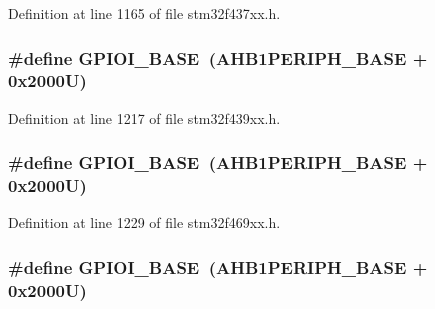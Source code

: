 Definition at line 1165 of file stm32f437xx.\+h.

\subsubsection[{\texorpdfstring{G\+P\+I\+O\+I\+\_\+\+B\+A\+SE}{GPIOI_BASE}}]{\setlength{\rightskip}{0pt plus 5cm}\#define G\+P\+I\+O\+I\+\_\+\+B\+A\+SE~({\bf A\+H\+B1\+P\+E\+R\+I\+P\+H\+\_\+\+B\+A\+SE} + 0x2000\+U)}\hypertarget{group___peripheral__memory__map_ga50acf918c2e1c4597d5ccfe25eb3ad3d}{}\label{group___peripheral__memory__map_ga50acf918c2e1c4597d5ccfe25eb3ad3d}


Definition at line 1217 of file stm32f439xx.\+h.

\subsubsection[{\texorpdfstring{G\+P\+I\+O\+I\+\_\+\+B\+A\+SE}{GPIOI_BASE}}]{\setlength{\rightskip}{0pt plus 5cm}\#define G\+P\+I\+O\+I\+\_\+\+B\+A\+SE~({\bf A\+H\+B1\+P\+E\+R\+I\+P\+H\+\_\+\+B\+A\+SE} + 0x2000\+U)}\hypertarget{group___peripheral__memory__map_ga50acf918c2e1c4597d5ccfe25eb3ad3d}{}\label{group___peripheral__memory__map_ga50acf918c2e1c4597d5ccfe25eb3ad3d}


Definition at line 1229 of file stm32f469xx.\+h.

\subsubsection[{\texorpdfstring{G\+P\+I\+O\+I\+\_\+\+B\+A\+SE}{GPIOI_BASE}}]{\setlength{\rightskip}{0pt plus 5cm}\#define G\+P\+I\+O\+I\+\_\+\+B\+A\+SE~({\bf A\+H\+B1\+P\+E\+R\+I\+P\+H\+\_\+\+B\+A\+SE} + 0x2000\+U)}\hypertarget{group___peripheral__memory__map_ga50acf918c2e1c4597d5ccfe25eb3ad3d}{}\label{group___peripheral__memory__map_ga50acf918c2e1c4597d5ccfe25eb3ad3d}


